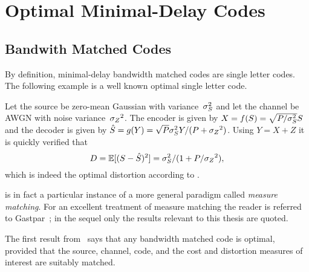 \section{Optimal Minimal-Delay Codes}
\label{sec:optmindel}

\subsection{Bandwith Matched Codes}

By definition, minimal-delay bandwidth matched codes are single letter codes.
The following example is a well known optimal single letter code.
\begin{example}
  \label{ex:gausssingle}
  Let the source be zero-mean Gaussian with variance~${\sigma_S^2}$ and let the channel
  be AWGN with noise variance~${{\sigma_Z}^2}$. The encoder is given by $X = f(S) =
  \sqrt{P/{\sigma_S^2}} S$ and the decoder is given by ${\hat{S}} = g(Y) = \sqrt{P} {\sigma_S^2} Y /
  (P + {{\sigma_Z}^2})$. Using $Y = X + Z$ it is quickly verified that 
  \begin{equation*}
    D = \mathbb{E}[(S - {\hat{S}})^2] = {\sigma_S^2} / (1 + P/{{\sigma_Z}^2}),
  \end{equation*}
  which is indeed the optimal distortion according to
  .
\end{example}

 is in fact a particular instance of a more general paradigm
called \emph{measure matching}. For an excellent treatment of measure matching
the reader is referred to Gastpar~\cite{GastparRV2003,GastparThesis}; in the
sequel only the results relevant to this thesis are quoted.

The first result from~\cite{GastparRV2003} says that any bandwidth matched code
is optimal, provided that the source, channel, code, and the cost and distortion
measures of interest are suitably matched.

